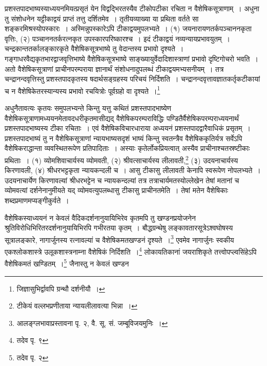 \documentclass[11pt, openany]{book}
\begin{document}
\newpage
प्रशस्तपादभाष्यस्याध्ययनमियत्प्रसृतं येन विद्वद्भिरतस्यैव टीकोपटीका रचिता न वैशेषिकसूत्राणाम्~। अधुना तु संशोधनेन यट्टीकाद्वयं प्राप्तं तत्तु दर्शितमेव~। तृतीयव्याख्या या प्रथिता वर्तते सा {\knu शङ्करमिश्रस्योपस्कारः~।} अस्मिन्नुपस्कारेऽपि टीकाद्वयमुपलभ्यते~। {\knu (१) जयनारायणतर्कपञ्चाननकृता वृत्तिः, (२) पञ्चाननतर्करत्नकृत उपस्कारपरिष्कारश्च~।} इदं टीकाद्वयं नव्यन्यायप्रभावयुतम्~। {\knu चन्द्रकान्ततर्कालङ्कार}कृते वैशेषिकसूत्रभाष्ये तु वेदान्तस्य प्रभावो दृश्यते~। {\knu गङ्गाधरवैद्य}कृतभारद्वाजवृत्तिभाष्ये वैशेषिकसूत्रभाष्ये साङ्ख्यायुर्वेदादिशास्त्राणां प्रभावो दृष्टिगोचरो भवति~। अतो वैशेषिकसूत्राणां प्राचीनपरम्पराया ज्ञानार्थं संशोधनादुपलब्धं टीकाद्वयमभ्यसनीयम्~। तत्र चन्द्रानन्दवृत्तिस्तु प्रशस्तपादकृतस्य षदार्थसङ्ग्रहस्य परिचयं निर्दिशति~। चन्द्रानन्दवृत्तावज्ञातकर्तृकटीकायां च न वैशेषिकेतरस्यान्यस्य प्रभावो रचयित्रोः पूर्वग्रहो वा दृश्यते~।\renewcommand{\thefootnote}{३२}\footnote{जिज्ञासुभिर्द्वावपि ग्रन्थौ दर्शनीयौ~।}

अधुनैतावत्यः कृतयः समुपलभ्यन्ते किन्तु यत्तु कथितं प्रशस्तपादभाष्येण वैशेषिकसूत्राणामध्ययनमेतावदधरीकृतमासीद्यद् वैशेषिकपरम्पराविद्धिः पण्डितैर्वैशेषिकपरम्पराध्ययनार्थं प्रशस्तपादभाष्यस्य टीका रचिताः~। एवं वैशेषिकविचारधाराया अध्ययनं प्रशस्तपादद्वारैवाधिकं प्रसृतम्~। प्रशस्तपादभाष्यं तु न वैशेषिकसूत्राणां न्यायभाष्यसदृशं भाष्यं किन्तु स्वतन्त्रैव वैशेषिककृतिर्यत्र सर्वेऽपि वैशेषिकराद्धान्ता व्यवस्थितरूपेण प्रतिपादिताः~। अस्याः कृतेर्लोकप्रियत्वात् अस्यैव प्राचीनाश्चतस्रष्टीकाः प्रथिताः~। (१) {\knu व्योमशिवाचार्यस्य व्योमवती}, (२) {\knu श्रीवत्साचार्य}स्य लीलावती,\renewcommand{\thefootnote}{३३}\footnote{टीकेयं वल्लभप्रणीताया न्यायलीलावत्या भिन्ना~।} (३) {\knu उदयनाचा}र्यस्य किरणावली, (४) {\knu श्रीधरभट्ट}कृता {\knu न्यायकन्दली} च~। आसु टीकासु {\knu लीलावती} केनापि स्वरूपेण नोपलभ्यते~। उदयनाचार्येण किरणावल्यां श्रीधरभट्टेन च न्यायकन्दल्यां तत्र तत्राचार्यमतस्योल्लेखेन तेषां मतानां च व्योमवत्यां दर्शनेनानुमीयते यद् व्योमवत्युपलब्धासु टीकासु प्राचीनतमेति~। तेषां मतेन वैशेषिकाः शब्दप्रमाणमप्यङ्गीकुर्वते~।

वैशेषिकस्याध्ययनं न केवलं वैदिकदर्शनानुयायिभिरेव कृतमपि तु खण्डनप्रयोजनेन श्रुतिविरोधिभिरितरदर्शनानुयायिभिरपि गभीरतया कृतम्~। बौद्धग्रन्थेषु {\knu लङ्कावतारसूत्रेऽश्वघोषस्य सूत्रालङ्कारे, नागार्जुनस्य रत्नावल्यां च} वैशेषिकमतखण्डनं दृश्यते~।\renewcommand{\thefootnote}{३४}\footnote{आलङ्ग्लभावाप्रस्तावना पृ. २, वै. सू. सं. जम्बूविजयमुनिः~।} एवमेव नागार्जुनः स्वकीय {\knu एकश्लोकशास्त्रे उलूकशास्त्रनाम्ना} वैशेषिकं निर्दिशति~।\renewcommand{\thefootnote}{३५}\footnote{तदेव पृ. ९} लोकायतिकानां {\knu जयराशि}कृते तत्त्वोपप्ल्वसिंहेऽपि वैशेषिकमतं खण्डितम्~।\renewcommand{\thefootnote}{३६}\footnote{तदेव पृ. २} जैनास्तु न केवलं खण्डन\textendash
\end{document}
